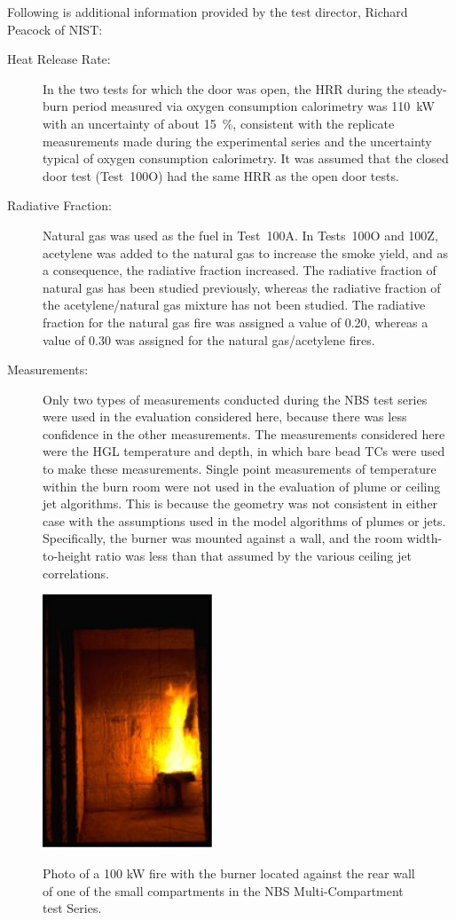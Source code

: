 Following is additional information provided by the test director, Richard Peacock of NIST:
\begin{description}
\item[Heat Release Rate:] In the two tests for which
the door was open, the HRR during the steady-burn period measured via oxygen consumption
calorimetry was 110~kW with an uncertainty of about 15~\%, consistent with the replicate
measurements made during the experimental series and the uncertainty typical of oxygen
consumption calorimetry. It was assumed that the closed door test (Test~100O) had the same HRR as the open
door tests.
\item[Radiative Fraction:] Natural gas was used as the fuel in
Test~100A. In Tests~100O and 100Z, acetylene was added to the natural gas to increase the
smoke yield, and as a consequence, the radiative fraction increased. The radiative fraction of
natural gas has been studied previously, whereas the radiative fraction of the acetylene/natural
gas mixture has not been studied. The radiative fraction for the natural gas fire was assigned a
value of 0.20, whereas a value of 0.30 was assigned for the natural gas/acetylene fires.
\item[Measurements:] Only two types of measurements conducted during the NBS test series were used in the
evaluation considered here, because there was less confidence in the other measurements.
The measurements considered here were the HGL temperature and depth, in which bare bead
TCs were used to make these measurements. Single point measurements of temperature within
the burn room were not used in the evaluation of plume or ceiling jet algorithms. This is because
the geometry was not consistent in either case with the assumptions used in the model algorithms
of plumes or jets. Specifically, the burner was mounted against a wall, and the room width-to-height
ratio was less than that assumed by the various ceiling jet correlations.
\end{description}

\begin{figure}
\begin{center}
\includegraphics[width=2.0in]{FIGURES/NBS/NBS_100kW_fire}  \\
\end{center}
\caption{Photo of a 100 kW fire with the burner located against the rear wall of one of the small compartments in the NBS Multi-Compartment test Series.}
 \label{fig:NBS_100kW_fire}
\end{figure}

